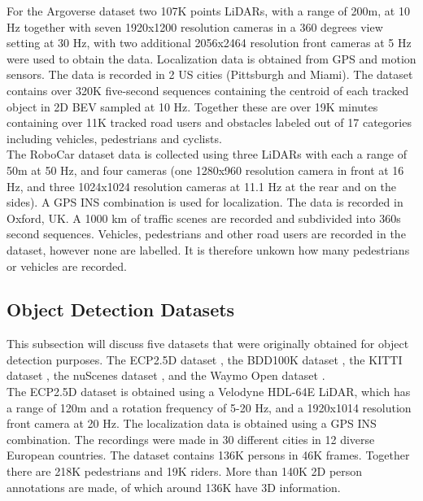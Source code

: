 For the Argoverse dataset \cite{chang2019argoverse} two 107K points LiDARs, with a range of 200m, at 10 Hz together with seven 1920x1200 resolution cameras in a 360 degrees view setting at 30 Hz, with two additional 2056x2464 resolution front cameras at 5 Hz were used to obtain the data. Localization data is obtained from GPS and motion sensors. The data is recorded in 2 US cities (Pittsburgh and Miami). The dataset contains over 320K five-second sequences containing the centroid of each tracked object in 2D \gls{BEV} sampled at 10 Hz. Together these are over 19K minutes containing over 11K tracked road users and obstacles labeled out of 17 categories including vehicles, pedestrians and cyclists. \\

The RoboCar dataset \cite{robotcardatasetijrr} data is collected using three LiDARs with each a range of 50m at 50 Hz, and four cameras (one 1280x960 resolution camera in front at 16 Hz, and three 1024x1024 resolution cameras at 11.1 Hz at the rear and on the sides). A GPS INS combination is used for localization. The data is recorded in Oxford, UK. A 1000 km of traffic scenes are recorded and subdivided into 360s second sequences. Vehicles, pedestrians and other road users are recorded in the dataset, however none are labelled. It is therefore unkown how many pedestrians or vehicles are recorded.


\subsection{Object Detection Datasets}
This subsection will discuss five datasets that were originally obtained for object detection purposes. The \gls{ECP2.5D} dataset \cite{braun2020ecp2}, the \gls{BDD100K} dataset \cite{yu2020bdd100k}, the \gls{KITTI} dataset \cite{geiger2012we}, the nuScenes dataset \cite{caesar2020nuscenes}, and the Waymo Open dataset \cite{sun2020scalability}. \\

The \gls{ECP2.5D} dataset \cite{braun2020ecp2} is obtained using a Velodyne HDL-64E LiDAR, which has a range of 120m and a rotation frequency of 5-20 Hz, and a 1920x1014 resolution front camera at 20 Hz. The localization data is obtained using a GPS INS combination. The recordings were made in 30 different cities in 12 diverse European countries. The dataset contains 136K persons in 46K frames. Together there are 218K pedestrians and 19K riders. More than 140K 2D person annotations are made, of which around 136K have 3D information. \\

